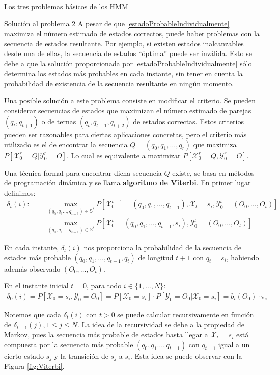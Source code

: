 \begin{section}{Los tres problemas básicos de los HMM}
\begin{subsection}{Solución al problema 2}
A pesar de que \eqref{estadoProbableIndividualmente} maximiza el número estimado de estados correctos, puede haber problemas con la secuencia de estados resultante. Por ejemplo, si existen estados inalcanzables desde una de ellas, la secuencia de estados \enquote{óptima} puede ser inválida. Esto se debe a que la solución proporcionada por \eqref{estadoProbableIndividualmente} sólo determina los estados más probables en cada instante, sin tener en cuenta la probabilidad de existencia de la secuencia resultante en ningún momento. 

Una posible solución a este problema consiste en modificar el criterio. Se pueden considerar secuencias de estados que maximizan el número estimado de parejas $(q_t,q_{t+1})$ o de ternas $(q_t,q_{t+1},q_{t+2})$ de estados correctas. Estos criterios pueden ser razonables para ciertas aplicaciones concretas, pero el criterio más utilizado es el de encontrar la secuencia $Q=(q_0, q_1, \dots, q_r)$ que maximiza $P[\mathcal{X}_0^r=Q|\mathcal{Y}_0^r=O]$. Lo cual es equivalente a maximizar $P[\mathcal{X}_0^r=Q,\mathcal{Y}_0^r=O]$.

Una técnica formal para encontrar dicha secuencia $Q$ existe, se basa en métodos de programación dinámica y se llama \textbf{algoritmo de Viterbi}. En primer lugar definimos:
\[
\begin{aligned}
    \delta_t(i):&=\max_{(q_0,q_1\dots,q_{t-1})\in\mathbb{S}^t}P[\mathcal{X}_0^{t-1}=(q_0,q_1,\dots,q_{t-1}),\mathcal{X}_t=s_i,\mathcal{Y}_0^t=(O_0,\dots,O_t)]\\
    &=\max_{(q_0,q_1\dots,q_{t-1})\in\mathbb{S}^t}P[\mathcal{X}_0^{t}=(q_0,q_1,\dots,q_{t-1},s_i),\mathcal{Y}_0^t=(O_0,\dots,O_t)]
\end{aligned}
\]

En cada instante, $\delta_t(i)$ nos proporciona la probabilidad de la secuencia de estados más probable $(q_0,q_1,\dots,q_{t-1},q_t)$ de longitud $t+1$ con $q_t=s_i$, habiendo además observado $(O_0,\dots,O_t)$. 

En el instante inicial $t=0$, para todo $i\in\{1,\dots,N\}$:
\[
\begin{aligned}
    \delta_0(i)=P[\mathcal{X}_0=s_i,\mathcal{Y}_0=O_0]=P[\mathcal{X}_0=s_i]\cdot P[\mathcal{Y}_0=O_0|\mathcal{X}_0=s_i]=b_i(O_0)\cdot\pi_i
\end{aligned}
\]

Notemos que cada $\delta_t(i)$ con $t>0$ se puede calcular recursivamente en función de $\delta_{t-1}(j),1\leq j\leq N$. La idea de la recursividad se debe a la propiedad de Markov, pues la secuencia más probable de estados hasta llegar a $\mathcal{X}_t=s_i$ está compuesta por la secuencia más probable $(q_0,q_1\dots,q_{t-1})$ con $q_{t-1}$ igual a un cierto estado $s_j$ y la transición de $s_j$ a $s_i$. Esta idea se puede observar con la Figura \ref{fig:Viterbi}. 


\end{subsection}
\end{section}
